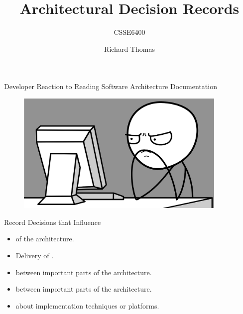 \documentclass{slide}
\title{Architectural Decision Records}
\subtitle{CSSE6400}
\author{Richard Thomas}
\date{\week{2}}
\begin{document}
\maketitle


\begin{frame}{Developer Reaction to Reading Software Architecture Documentation}

\begin{figure}
    \href{https://pixabay.com/vectors/computer-internet-unhappy-user-1295358/}{\includegraphics[width=0.9\textwidth]{images/frustration.png}}
\end{figure}

\end{frame}


{}


\begin{frame}{Record Decisions that Influence}

\Large{
\begin{itemize}
    \item {} of the architecture.
    \item Delivery of .
    \item {} between important parts of the architecture.
    \item {} between important parts of the architecture.
    \item {} about implementation techniques or platforms.
\end{itemize}
}

\end{frame}
\end{document}
